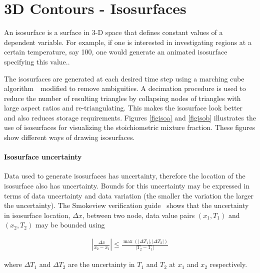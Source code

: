 \documentclass[11pt,twoside]{book}
\begin{document}
%
%

\clearpage
\section{3D Contours - Isosurfaces}
An isosurface is a surface in 3-D space that defines constant
values of a dependent variable. For example, if one is interested
in investigating regions at a certain temperature, say
\SI{100}{\degC}, one would generate an animated isosurface
specifying this value..

The isosurfaces are generated at each desired time step using a
marching cube algorithm~\cite{marchingcubes}\ modified to remove
ambiguities. A decimation procedure is used to reduce the number
of resulting triangles by collapsing nodes of triangles with large
aspect ratios and re-triangulating. This makes the isosurface look
better and also reduces storage requirements. Figures
\ref{figisoa} and \ref{figisob} illustrates the use of isosurfaces
for visualizing the stoichiometric mixture fraction. These figures
show different ways of drawing isosurfaces.

\paragraph{Isosurface uncertainty} Data used to generate isosurfaces has uncertainty, therefore the location of the isosurface
also has uncertainty.  Bounds for this uncertainty may be expressed in terms of data uncertainty and data variation (the smaller the variation the larger the uncertainty).
The Smokeview verification guide~\cite{Smokeview_Verification_Guide} shows that the uncertainty in isosurface location, $\Delta x$, between two node, data value pairs $(x_1,T_1)$ and $(x_2,T_2)$  may be bounded using

\begin{eqnarray}
\left|\frac{\Delta x}{x_2-x_1}\right|\le
\frac{\max(|\Delta T_1|,|\Delta T_2|)}{|T_2-T_1|}
\end{eqnarray}

\noindent where $\Delta T_1$ and $\Delta T_2$ are the uncertainty in $T_1$ and $T_2$ at $x_1$ and $x_2$ respectively.
\end{document}
